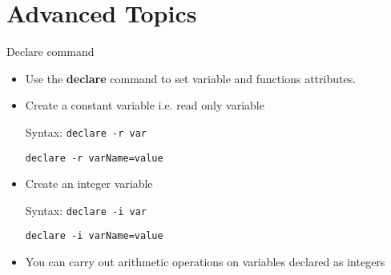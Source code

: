 \documentclass[slidestop,mathserif,compress,xcolor=svgnames]{beamer}
\newenvironment{eblock}[0]
{
\begin{beamerboxesrounded}[upper=uppercol2,lower=lowercol2,shadow=true]}
{\end{beamerboxesrounded}}
\begin{document}
\section{Advanced Topics}
\begin{frame}[fragile]{\small Declare command}
  \begin{itemize}
    \item Use the \textbf{declare} command to set variable and functions attributes.
    \item Create a constant variable i.e. read only variable
    \item[Syntax:] \texttt{declare -r var}
    \item[] \texttt{declare -r varName=value}
    \item Create an integer variable
    \item[Syntax:] \texttt{declare -i var}
    \item[] \texttt{declare -i varName=value}
    \item You can carry out arithmetic operations on variables declared as integers
  \end{itemize}
\end{frame}
\end{document}
